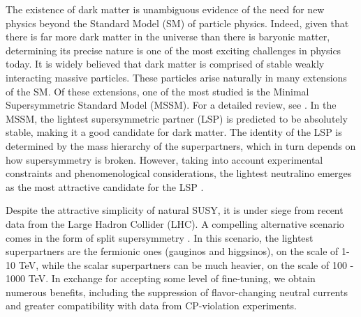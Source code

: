 
The existence of dark matter is unambiguous evidence of the need for new physics beyond the Standard Model (SM) of particle physics. Indeed, given that there is far more dark matter in the universe than there is baryonic matter, determining its precise nature is one of the most exciting challenges in physics today. It is widely believed that dark matter is comprised of stable weakly interacting massive particles. These particles arise naturally in many extensions of the SM. Of these extensions, one of the most studied is the Minimal Supersymmetric Standard Model (MSSM). For a detailed review, see \citep{Martin1997}. In the MSSM, the lightest supersymmetric partner (LSP) is predicted to be absolutely stable, making it a good candidate for dark matter. The identity of the LSP is determined by the mass hierarchy of the superpartners, which in turn depends on how supersymmetry is broken. However, taking into account experimental constraints and phenomenological considerations, the lightest neutralino emerges as the most attractive candidate for the LSP \citep{Bertone2005a}. 

Despite the attractive simplicity of natural SUSY, it is under siege from recent  data from the Large Hadron Collider (LHC). A compelling alternative scenario comes in the form of split supersymmetry  \citep{Wells:2003tf, Dimopoulos2004, Giudice2005}. In this scenario, the lightest superpartners are the fermionic ones (gauginos and higgsinos), on the scale of 1-10 TeV, while the scalar superpartners can be much heavier, on the scale of 100 - 1000 TeV. In exchange for accepting some level of fine-tuning, we obtain numerous benefits, including the suppression of flavor-changing neutral currents and greater compatibility with data from CP-violation experiments.

